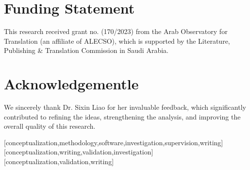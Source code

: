 \documentclass[english]{textolivre}
\begin{document}
\begin{polyabstract}
\begin{abstract}
\end{abstract}


\end{polyabstract}








\printbibliography\label{sec-bib}

\section*{Funding Statement}

This research received grant no. (170/2023) from the Arab Observatory for Translation (an affiliate of ALECSO), which is supported by the Literature, Publishing \& Translation Commission in Saudi Arabia.

\section*{Acknowledgementle}

We sincerely thank Dr. Sixin Liao for her invaluable feedback, which significantly contributed to refining the ideas, strengthening the analysis, and improving the overall quality of this research.  

\begin{contributors}
	
[conceptualization,methodology,software,investigation,supervision,writing]
[conceptualization,writing,validation,investigation]
[conceptualization,validation,writing]
\end{contributors}
\end{document}
